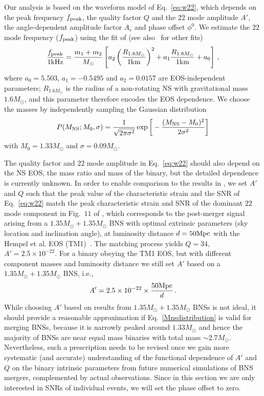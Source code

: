 \documentclass[prd,aps,floatfix,superscriptaddress,nofootinbib,twocolumn,10pt,English]{revtex4-1}
\begin{document}
Our analysis is based on the waveform model of Eq.~\eqref{eq:w22}, which
depends on the
peak frequency $f_{\rm peak}$, the quality factor $Q$ and the 22 mode amplitude
$A'$, the angle-dependent amplitude factor $A_r$ and phase offset $\phi^{0}$. 
We estimate the $22$ mode frequency ($f_{\rm peak}$) using the
fit of \cite{bauswein2015exploring} (see
also~\cite{Bauswein:2012ya,Bauswein:2014qla,Takami2014,Takami:2014tva,Bauswein:2015yca,Lehner:2016lxy}
for other fits)
%
\begin{align}\label{eq:fp}
\frac{f_{\rm peak}}{1  {\rm kHz}} 
= \frac{m_1+m_2}{M_\odot} \left [a_2 \left(\frac{R_{1.6 M_\odot}}{1 {\rm km}} \right)^2 +a_1 \frac{R_{1.6 M_\odot}}{1 {\rm km}} +a_0\right ]\,,
\end{align}
%
where $a_0=5.503$, $a_1=-0.5495$ and $a_2=0.0157$ are EOS-independent parameters;
$R_{1.6 M_\odot}$ is the radius of a non-rotating NS with gravitational mass
$1.6M_\odot$, and this parameter therefore encodes the EOS dependence.
We choose the masses by 
independently sampling the Gaussian distribution 
\cite{ozel2016masses}
%
\begin{align}
P(M_{\rm NS};M_0,\sigma) = \frac{1}{\sqrt{2\pi \sigma^2}}\exp\bigg[-\frac{(M_{\rm NS}-M_0)^2}{2\sigma^2}\bigg] \label{Mnsdistribution}
\end{align}
%
with $M_0=1.33M_\odot$ and $\sigma=0.09M_\odot$.

The quality factor and $22$ mode amplitude 
in Eq.~\eqref{eq:w22} should also depend on the NS EOS, the mass ratio
and mass of the binary, but the detailed dependence is currently
unknown. In order to enable comparison to the results in
\cite{clark2016observing}, we set $A'$ and $Q$ such that the peak
value of the characteristic strain and the SNR of Eq.~\eqref{eq:w22}
match the peak characteristic strain and SNR of the dominant $22$ mode
component in Fig.~$11$ of \cite{clark2016observing}, which corresponds
to the post-merger signal arising from a $1.35 M_\odot+1.35 M_\odot$
BNS with optimal extrinsic parameters (sky location and inclination
angle), at luminosity distance $d= 50 {\rm Mpc}$ with the Hempel et
al. EOS (TM1)~\cite{Hempel:2011mk}. The matching process yields
$Q=34$, $A'=2.5 \times 10^{-22}$. For a binary obeying the TM1 EOS,
but with different component masses and luminosity distance we still
set $A'$ based on a $1.35 M_\odot+1.35 M_\odot$ BNS, i.e.,
%
\begin{align}
A' = 2.5 \times 10^{-22} \times \frac{50 {\rm Mpc}}{d}\,.
\end{align}
%
While choosing $A'$ based on results from $1.35 M_\odot+1.35 M_\odot$
BNSs is not ideal, it should provide a reasonable approximation if
Eq.~\eqref{Mnsdistribution} is valid for merging BNSs, because it is
narrowly peaked around $1.33M_\odot$ and hence the majority of BNSs
are near equal mass binaries with total mass $\sim 2.7M_\odot$.
Nevertheless, such a prescription needs to be revised once we gain
more systematic (and accurate) understanding of the functional
dependence of $A'$ and $Q$ on the binary intrinsic parameters from
future numerical simulations of BNS mergers, complemented by actual
observations. Since in this section we are only interested in SNRs of
individual events, we will set the phase offset to zero.
\end{document}
